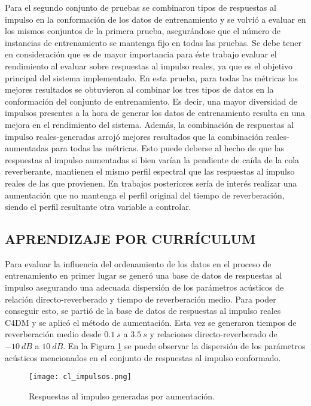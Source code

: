 Para el segundo conjunto de pruebas se combinaron tipos de respuestas al impulso en la conformación de los datos de entrenamiento y se volvió a evaluar en los mismos conjuntos de la primera prueba, asegurándose que el número de instancias de entrenamiento se mantenga fijo en todas las pruebas. Se debe tener en consideración que es de mayor importancia para éste trabajo evaluar el rendimiento al evaluar sobre respuestas al impulso reales, ya que es el objetivo principal del sistema implementado. En esta prueba, para todas las métricas los mejores resultados se obtuvieron al combinar los tres tipos de datos en la conformación del conjunto de entrenamiento. Es decir, una mayor diversidad de impulsos presentes a la hora de generar los datos de entrenamiento resulta en una mejora en el rendimiento del sistema. Además, la combinación de respuestas al impulso reales-generadas arrojó mejores resultados que la combinación reales-aumentadas para todas las métricas. Esto puede deberse al hecho de que las respuestas al impulso aumentadas si bien varían la pendiente de caída de la cola reverberante, mantienen el mismo perfil espectral que las respuestas al impulso reales de las que provienen. En trabajos posteriores sería de interés realizar una aumentación que no mantenga el perfil original del tiempo de reverberación, siendo el perfil resultante otra variable a controlar. 


\subsection[Aprendizaje por currículum]{APRENDIZAJE POR CURRÍCULUM}
Para evaluar la influencia del ordenamiento de los datos en el proceso de entrenamiento en primer lugar se generó una base de datos de respuestas al impulso asegurando una adecuada dispersión de los parámetros acústicos de relación directo-reverberado y tiempo de reverberación medio. Para poder conseguir esto, se partió de la base de datos de respuestas al impulso reales C4DM y se aplicó el método de aumentación. Esta vez se generaron tiempos de reverberación medio desde $0.1 \ s$ a $3.5 \ s$ y relaciones directo-reverberado de $-10 \ dB$ a $10 \ dB$. En la Figura \ref{fig:cl_impulsos} se puede observar la dispersión de los parámetros acústicos mencionados en el conjunto de respuestas al impulso conformado.

\begin{figure}[H]
	\centering{}
	\texttt{[image: cl\_impulsos.png]}
	\caption{Respuestas al impulso generadas por aumentación.}
	\label{fig:cl_impulsos}
\end{figure}

